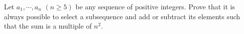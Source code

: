 Let $a_1, \cdots, a_n$ $(n \geq 5)$ be any sequence of positive integers. Prove that it is always possible to select a subsequence and add or subtract its elements such that the sum is a multiple of $n^2$.
